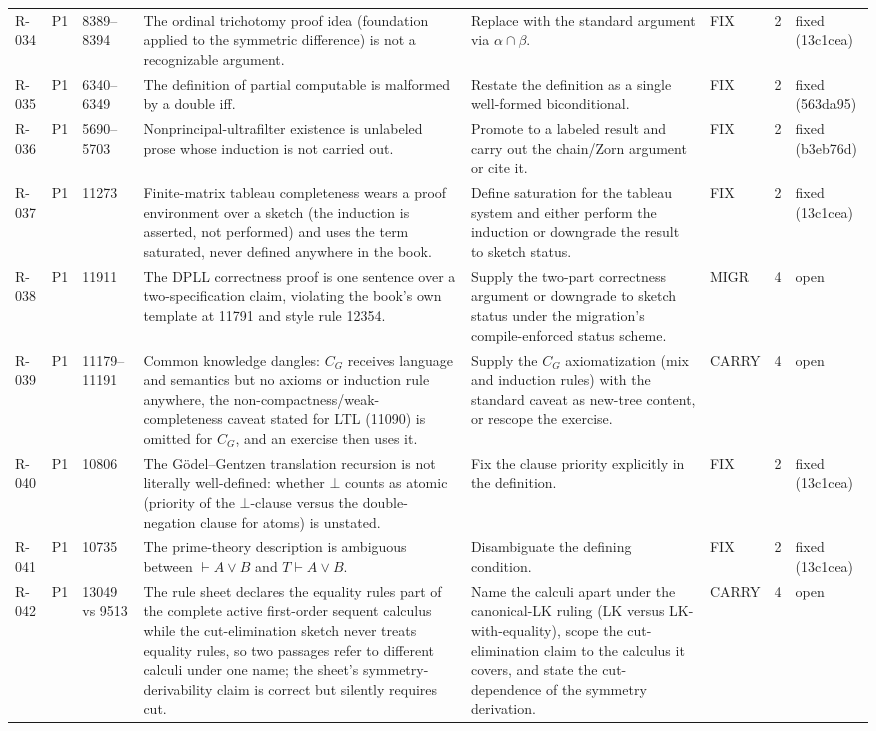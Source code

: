 \begin{longtable}{@{}p{0.45in}p{0.25in}p{0.7in}p{2.2in}p{1.75in}p{0.45in}p{0.16in}p{0.34in}@{}}
R-034 & P1 & 8389--8394 & The ordinal trichotomy proof idea (foundation applied to the symmetric difference) is not a recognizable argument. & Replace with the standard argument via \(\alpha\cap\beta\). & FIX & 2 & fixed (13c1cea) \\
R-035 & P1 & 6340--6349 & The definition of partial computable is malformed by a double iff. & Restate the definition as a single well-formed biconditional. & FIX & 2 & fixed (563da95) \\
R-036 & P1 & 5690--5703 & Nonprincipal-ultrafilter existence is unlabeled prose whose induction is not carried out. & Promote to a labeled result and carry out the chain/Zorn argument or cite it. & FIX & 2 & fixed (b3eb76d) \\
R-037 & P1 & 11273 & Finite-matrix tableau completeness wears a proof environment over a sketch (the induction is asserted, not performed) and uses the term saturated, never defined anywhere in the book. & Define saturation for the tableau system and either perform the induction or downgrade the result to sketch status. & FIX & 2 & fixed (13c1cea) \\
R-038 & P1 & 11911 & The DPLL correctness proof is one sentence over a two-specification claim, violating the book's own template at 11791 and style rule 12354. & Supply the two-part correctness argument or downgrade to sketch status under the migration's compile-enforced status scheme. & MIGR & 4 & open \\
R-039 & P1 & 11179--11191 & Common knowledge dangles: \(C_G\) receives language and semantics but no axioms or induction rule anywhere, the non-compactness/weak-completeness caveat stated for LTL (11090) is omitted for \(C_G\), and an exercise then uses it. & Supply the \(C_G\) axiomatization (mix and induction rules) with the standard caveat as new-tree content, or rescope the exercise. & CARRY & 4 & open \\
R-040 & P1 & 10806 & The G\"odel--Gentzen translation recursion is not literally well-defined: whether \(\bot\) counts as atomic (priority of the \(\bot\)-clause versus the double-negation clause for atoms) is unstated. & Fix the clause priority explicitly in the definition. & FIX & 2 & fixed (13c1cea) \\
R-041 & P1 & 10735 & The prime-theory description is ambiguous between \(\vdash A\lor B\) and \(T\vdash A\lor B\). & Disambiguate the defining condition. & FIX & 2 & fixed (13c1cea) \\
R-042 & P1 & 13049 vs 9513 & The rule sheet declares the equality rules part of the complete active first-order sequent calculus while the cut-elimination sketch never treats equality rules, so two passages refer to different calculi under one name; the sheet's symmetry-derivability claim is correct but silently requires cut. & Name the calculi apart under the canonical-LK ruling (LK versus LK-with-equality), scope the cut-elimination claim to the calculus it covers, and state the cut-dependence of the symmetry derivation. & CARRY & 4 & open \\

\end{longtable}
